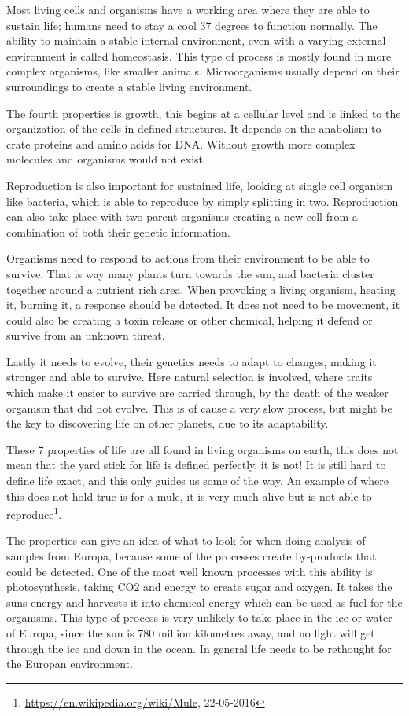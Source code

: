 Most living cells and organisms have a working area where they are able to sustain life; humans need to stay a cool 37 degrees to function normally. The ability to maintain a stable internal environment, even with a varying external environment is called homeostasis. This type of process is mostly found in more complex organisms, like smaller animals. Microorganisms usually depend on their surroundings to create a stable living environment.

The fourth properties is growth, this begins at a cellular level and is linked to the organization of the cells in defined structures. It depends on the anabolism to crate proteins and amino acids for DNA. Without growth more complex molecules and organisms would not exist.

Reproduction is also important for sustained life, looking at single cell organism like bacteria, which is able to reproduce by simply splitting in two. Reproduction can also take place with two parent organisms creating a new cell from a combination of both their genetic information.

Organisms need to respond to actions from their environment to be able to survive. That is way many plants turn towards the sun, and bacteria cluster together around a nutrient rich area. When provoking a living organism, heating it, burning it, a response should be detected. It does not need to be movement, it could also be creating a toxin release or other chemical, helping it defend or survive from an unknown threat.

Lastly it needs to evolve, their genetics needs to adapt to changes, making it stronger and able to survive. Here natural selection is involved, where traits which make it easier to survive are carried through, by the death of the weaker organism that did not evolve. This is of cause a very slow process, but might be the key to discovering life on other planets, due to its adaptability.

These 7 properties of life are all found in living organisms on earth, this does not mean that the yard stick for life is defined perfectly, it is not! It is still hard to define life exact, and this only guides us some of the way. An example of where this does not hold true is for a mule, it is very much alive but is not able to reproduce\footnote{\url{https://en.wikipedia.org/wiki/Mule}, 22-05-2016}.

The properties can give an idea of what to look for when doing analysis of samples from Europa, because some of the processes create by-products that could be detected. One of the most well known processes with this ability is photosynthesis, taking CO2 and energy to create sugar and oxygen. It takes the suns energy and harvests it into chemical energy which can be used as fuel for the organisms. This type of process is very unlikely to take place in the ice or water of Europa, since the sun is 780 million kilometres away, and no light will get through the ice and down in the ocean. In general life needs to be rethought for the Europan environment.

